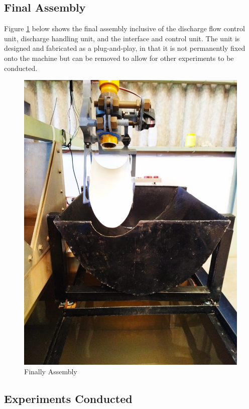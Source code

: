 \subsection{Final Assembly}
\par 
Figure \ref{fig: Finally Assembly} below shows the final assembly inclusive of the discharge flow control unit, discharge handling unit, and the interface and control unit. The unit is designed and fabricated as a plug-and-play, in that it is not permanently fixed onto the machine but can be removed to allow for other experiments to be conducted.
\begin{figure}[H]
            \centering
            \includegraphics[width=.7\textwidth]{Figures/FinalAssembly.jpeg}
            \caption{Finally Assembly}
            \label{fig: Finally Assembly}
        \end{figure}

\subsection{Experiments Conducted}


